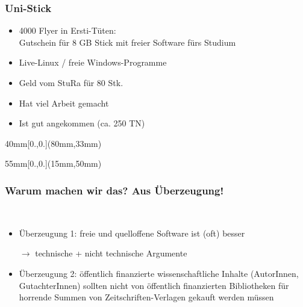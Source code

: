 \documentclass{beamer}
\begin{document}
\begin{frame}[label=ct1b,t]
  \frametitle{Uni-Stick}

  \vspace{-5mm}

  \begin{itemize}
  \item 4000 Flyer in Ersti-Tüten:\\
    Gutschein für 8 GB Stick mit freier Software fürs Studium
  \item Live-Linux / freie Windows-Programme
  \item Geld vom StuRa für 80 Stk.
    \pause
  \item Hat viel Arbeit gemacht
    \pause
  \item Ist gut angekommen (ca. 250 TN)
  \end{itemize}

  \begin{textblock*}{40mm}[0.,0.](80mm,33mm)
  \end{textblock*}

  \begin{textblock*}{55mm}[0.,0.](15mm,50mm)
  \end{textblock*}

\end{frame}

\begin{frame}[label=ct2]
  \frametitle{Warum machen wir das? Aus Überzeugung!}

  ~\\[6mm]

  \begin{itemize}
  \item Überzeugung 1: freie und quelloffene Software ist (oft) besser
  \item[$\rightarrow$] technische + nicht technische Argumente\\[8mm]
    \pause
  \item Überzeugung 2: öffentlich finanzierte wissenschaftliche Inhalte
    (AutorInnen, GutachterInnen) sollten nicht von öffentlich finanzierten
    Bibliotheken für horrende Summen von Zeitschriften-Verlagen gekauft werden
    müssen
  \end{itemize}
\end{frame}
\end{document}
